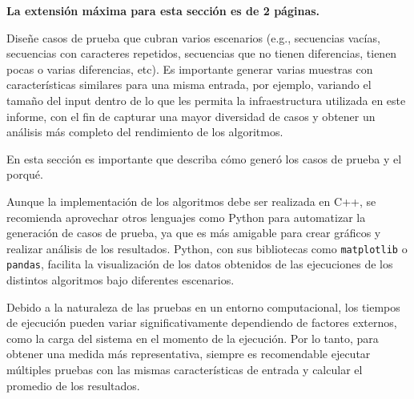 \begin{mdframed}
    \textbf{La extensión máxima para esta sección es de 2 páginas.}
\end{mdframed}

Diseñe casos de prueba que cubran varios escenarios (e.g., secuencias vacías, secuencias con caracteres repetidos, secuencias que no tienen diferencias, tienen pocas o varias diferencias, etc).  
Es importante generar varias muestras con características similares para una misma entrada, por ejemplo, variando el tamaño del input dentro de lo que les permita la infraestructura utilizada en este informe, con el fin de capturar una mayor diversidad de casos y obtener un análisis más completo del rendimiento de los algoritmos.

En esta sección es importante que describa cómo generó los casos de prueba y el porqué.

\begin{mdframed}
    Aunque la implementación de los algoritmos debe ser realizada en C++, se recomienda aprovechar otros lenguajes como Python para automatizar la generación de casos de prueba, ya que es más amigable para crear gráficos y realizar análisis de los resultados. Python, con sus bibliotecas como \texttt{matplotlib} o \texttt{pandas}, facilita la visualización de los datos obtenidos de las ejecuciones de los distintos algoritmos bajo diferentes escenarios.
\end{mdframed}

\begin{mdframed}
    Debido a la naturaleza de las pruebas en un entorno computacional, los tiempos de ejecución pueden variar significativamente dependiendo de factores externos, como la carga del sistema en el momento de la ejecución. Por lo tanto, para obtener una medida más representativa, siempre es recomendable ejecutar múltiples pruebas con las mismas características de entrada y calcular el promedio de los resultados.
\end{mdframed}
